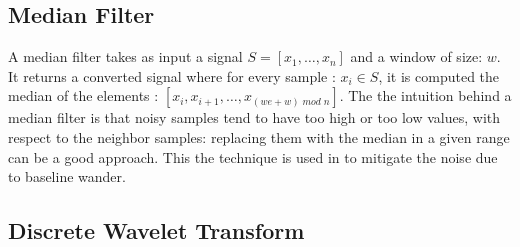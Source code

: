 \documentclass[LaM,binding=0.6cm]{sapthesis}
\begin{document}
\subsection{Median Filter}
A median filter takes as input a signal $S = [x_1, \dots, x_n]$ and a window of size: $w$. It returns a converted signal where for every sample : $x_i \in S$, it is computed the median of the elements : $[x_i, x_{i+1}, \dots , x_{(we+w) \; mod \; n}]$. The the intuition behind a median filter is that noisy samples tend to have too high or too low values, with respect to the neighbor samples: replacing them with the median in a given range can be a good approach. This the technique is used in \cite{rfdwt} to mitigate the noise due to baseline wander.




\subsection{Discrete Wavelet Transform}
\end{document}
